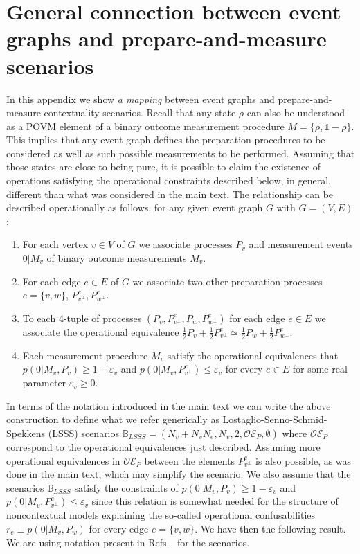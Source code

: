 \documentclass[letterpaper,onecolumn,12pt,accepted=2024-01-17]{article}
\begin{document}
\section{General connection between event graphs and prepare-and-measure scenarios}\label{appendix: general}

In this appendix we show \textit{a mapping} between event graphs and prepare-and-measure contextuality scenarios. Recall that any state $\rho$ can also be understood as a POVM element of a binary outcome measurement procedure $M = \{\rho, \mathbb{1}-\rho\}$. This implies that any event graph defines  the preparation procedures to be considered as well as such possible measurements to be performed. Assuming that those states are close to being pure, it is possible to claim the existence of operations satisfying the operational constraints described below, in general, different than what was considered in the main text. The relationship can be described operationally as follows, for any given event graph $G$ with $G=(V,E)$:

\begin{enumerate}
    \item For each vertex $v \in V$ of $G$ we associate processes $P_v$ and measurement events $0\vert M_v$ of binary outcome measurements $M_v$. 
    \item For each edge $e \in E$ of $G$ we associate two other preparation processes $e= \{v,w\}$, $P_{v^\perp}^e, P_{w^\perp}^e$. 
    \item To each $4$-tuple of processes $(P_v,P_{v^\perp}^e,P_w,P_{w^\perp}^e)$ for each edge $e \in E$ we associate the operational equivalence $\frac{1}{2}P_v + \frac{1}{2}P_{v^\perp}^e \simeq \frac{1}{2}P_w + \frac{1}{2}P_{w^\perp}^e$.
    \item Each measurement procedure $M_v$ satisfy the operational equivalences that $p(0 \vert M_v,P_v) \geq 1-\varepsilon_v$ and $p(0 \vert M_v,P_{v^\perp}^e) \leq \varepsilon_v$ for every $e \in E$ for some real parameter $\varepsilon_v \geq 0$.
\end{enumerate}
In terms of the notation introduced in the main text we can write the above construction to define what we refer generically as Lostaglio-Senno-Schmid-Spekkens (LSSS) scenarios $\mathbb{B}_{LSSS} = (N_v + N_vN_e,N_v,2,\mathcal{OE}_P,\emptyset)$ where $\mathcal{OE}_P$ correspond to the operational equivalences just described. Assuming more operational equivalences in $\mathcal{OE}_P$ between the elements $P_{v^\perp}^e$ is also possible, as was done in the main text, which may simplify the scenario. We also assume that the scenarios $\mathbb{B}_{LSSS}$ satisfy the constraints of $p(0\vert M_v,P_v)\geq 1-\varepsilon_v$ and $p(0\vert M_v,P_{v^\perp}^e) \leq \varepsilon_v$ since this relation is somewhat needed for the structure of noncontextual models explaining the so-called operational confusabilities $r_{e} \equiv p(0\vert M_v,P_w)$ for every edge $e=\{v,w\}$. We have then the following result. We are using notation present in Refs.~\cite{chaturvedi2021characterising,wagner2021using} for the scenarios.
\end{document}
